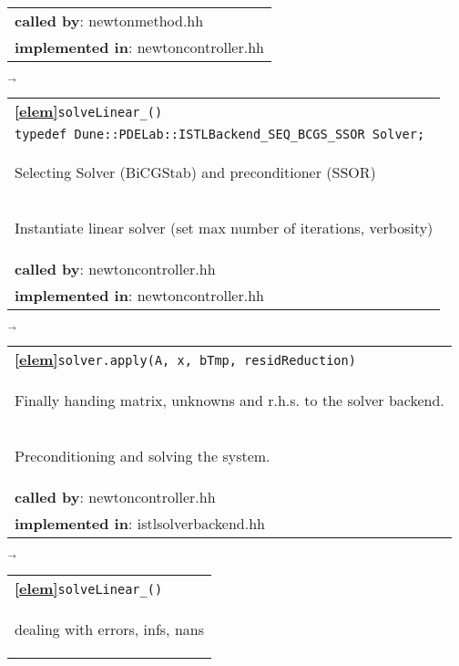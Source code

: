 \begin{landscape}
{\begin{tabular}{|l|}
      \textbf{called by}: newtonmethod.hh\\ 
      \textbf{implemented in}: newtoncontroller.hh\\ 
	\hline 
  \end{tabular}
    {\scriptsize$\overrightarrow{}
    $}
   \begin{tabular}{|l|} 
      \hline 
      \textbf{\textcircled{\ref{elem}}}\verb+solveLinear_()+\\ 
						       \verb+typedef Dune::PDELab::ISTLBackend_SEQ_BCGS_SSOR Solver;+\\
      \begin{scriptsize}Selecting Solver (BiCGStab) and preconditioner (SSOR)\end{scriptsize}\\
      \begin{scriptsize}Instantiate linear solver (set max number of iterations, verbosity)\end{scriptsize}\\
      \textbf{called by}: newtoncontroller.hh\\ 
      \textbf{implemented in}: newtoncontroller.hh\\ 
	\hline 
  \end{tabular}
\nextline
    {\scriptsize$\overrightarrow{}
    $}
   \begin{tabular}{|l|} 
      \hline 
      \textbf{\textcircled{\ref{elem}}}\verb+solver.apply(A, x, bTmp, residReduction)+\\ 
      \begin{scriptsize}Finally handing matrix, unknowns and r.h.s. to the solver backend.\end{scriptsize}\\
      \begin{scriptsize}Preconditioning and solving the system. \end{scriptsize}\\
      \textbf{called by}: newtoncontroller.hh\\ 
      \textbf{implemented in}: istlsolverbackend.hh\\ 
	\hline 
  \end{tabular}
    {\scriptsize$\overrightarrow{}
    $}
   \begin{tabular}{|l|} 
      \hline 
      \textbf{\textcircled{\ref{elem}}}\verb+solveLinear_()+\\ 
      \begin{scriptsize}dealing with errors, infs, nans \end{scriptsize}\\

\end{tabular}}
\end{landscape}
